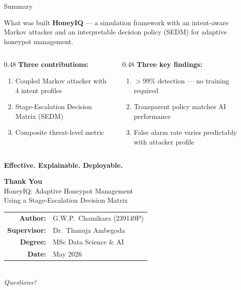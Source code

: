 \documentclass[aspectratio=169, 12pt]{beamer}
\begin{document}
\begin{frame}{Summary}
  \begin{block}{What was built}
    \textbf{HoneyIQ} — a simulation framework with an intent-aware Markov attacker and
    an interpretable decision policy (SEDM) for adaptive honeypot management.
  \end{block}
  \vspace{0.3cm}
  \begin{columns}[T]
    \begin{column}{0.48\textwidth}
      \textbf{Three contributions:}
      \begin{enumerate}
        \item Coupled Markov attacker with 4 intent profiles
        \item Stage-Escalation Decision Matrix (SEDM)
        \item Composite threat-level metric
      \end{enumerate}
    \end{column}
    \begin{column}{0.48\textwidth}
      \textbf{Three key findings:}
      \begin{enumerate}
        \item $>$99\% detection — no training required
        \item Transparent policy matches AI performance
        \item False alarm rate varies predictably with attacker profile
      \end{enumerate}
    \end{column}
  \end{columns}
  \vspace{0.4cm}
  \begin{center}
    \large\textcolor{honeyblue}{\textbf{Effective. Explainable. Deployable.}}
  \end{center}
\end{frame}

\begin{frame}[plain]
  \begin{center}
    \vspace{1.5cm}
    {\Huge\textbf{Thank You}}\\[1cm]
    {\large HoneyIQ: Adaptive Honeypot Management\\
    Using a Stage-Escalation Decision Matrix}\\[1cm]
    \begin{tabular}{rl}
      \textbf{Author:}     & G.W.P.\ Chamikara (239149P) \\
      \textbf{Supervisor:} & Dr.\ Thanuja Ambegoda \\
      \textbf{Degree:}     & MSc Data Science \& AI \\
      \textbf{Date:}       & May 2026 \\
    \end{tabular}\\[1cm]
    {\large\textit{Questions?}}
  \end{center}
\end{frame}
\end{document}

